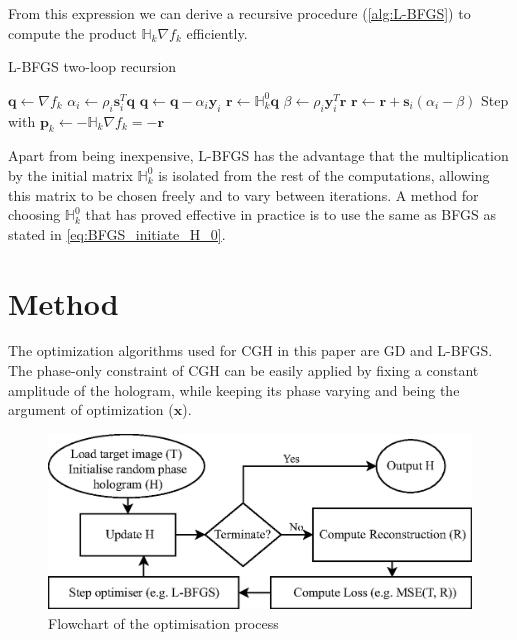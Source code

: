 From this expression we can derive a recursive procedure (\cref{alg:L-BFGS}) to compute the product $\mathbb{H}_{k} \nabla f_k$ efficiently.

\begin{algorithm}[H]
  \caption{L-BFGS two-loop recursion \cite{Nocedal2006}}\label{alg:L-BFGS}
  \begin{algorithmic}
    \State $\textbf{q} \gets \nabla f_k$
    \State $\alpha_i \gets \rho_i \textbf{s}_i^T \textbf{q}$
    \State $ \textbf{q} \gets \textbf{q} - \alpha_i\textbf{y}_i$
    \EndFor
    \State $\textbf{r}\gets \mathbb{H}_k^0 \textbf{q}$
    \State $\beta \gets \rho_i \textbf{y}_i^T \textbf{r}$
    \State $ \textbf{r} \gets \textbf{r} +\textbf{s}_i (\alpha_i-\beta)$
    \EndFor
    \State Step with $\textbf{p}_k \gets -\mathbb{H}_k \nabla f_{k} = -\textbf{r}$
  \end{algorithmic}
\end{algorithm}

Apart from being inexpensive, L-BFGS has the advantage that the multiplication by the initial matrix $\mathbb{H}_k^0$ is isolated from the rest of the computations, allowing this matrix to be chosen freely and to vary between iterations. A method for choosing $\mathbb{H}_k^0$ that has proved effective in practice is to use the same as BFGS as stated in \cref{eq:BFGS_initiate_H_0}. \cite{Nocedal2006}





\section{Method}



The optimization algorithms used for CGH in this paper are GD and L-BFGS. The phase-only constraint of CGH can be easily applied by fixing a constant amplitude of the hologram, while keeping its phase varying and being the argument of optimization ($\textbf{x}$).

\begin{figure}[H]
	\centering
	\includegraphics[width=\textwidth]{optim_flowchart_2D.eps}
	\caption{Flowchart of the optimisation process}
	\label{fig:optim_flowchart_2D}
\end{figure}




